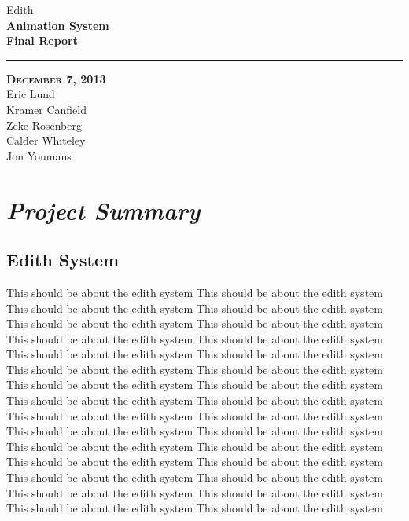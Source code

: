 \documentclass[12pt]{article}
\begin{document}
\begin{titlepage}
	\begin{center}
	\huge  Edith \\
	\vspace*{\fill}%
 	\huge \textbf{Animation System \\Final Report}
	\bigskip 
	\rule{130mm}{.1pt}
	\textsc{\textbf{December 7, 2013} \\ }
	\vspace*{\fill}%
	Eric Lund \\
	Kramer Canfield \\ 
	Zeke Rosenberg \\
	Calder Whiteley \\
	Jon Youmans
	\end{center}
\end{titlepage}

\section{\emph{Project Summary}}%
\subsection{Edith System}
\begin{changemargin}{1cm}{0cm} 
This should be about the edith system This should be about the edith system This should be about the edith system This should be about the edith system This should be about the edith system This should be about the edith system This should be about the edith system This should be about the edith system This should be about the edith system This should be about the edith system This should be about the edith system This should be about the edith system This should be about the edith system This should be about the edith system This should be about the edith system This should be about the edith system This should be about the edith system This should be about the edith system This should be about the edith system This should be about the edith system This should be about the edith system This should be about the edith system This should be about the edith system This should be about the edith system This should be about the edith system This should be about the edith system This should be about the edith system This should be about the edith system This should be about the edith system This should be about the edith system
\end{changemargin} 
\end{document}
